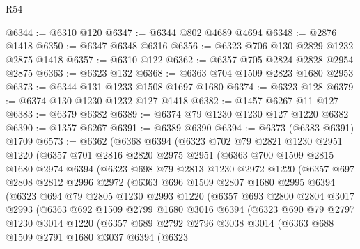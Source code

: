 \begin{lexlean}{R54}
\begin{coremodule}
@6344 := @6310 @120
@6347 := @6344 @802 @4689 @4694
@6348 := @2876 @1418
@6350 := @6347 @6348 @6316
@6356 := @6323 @706 @130 @2829 @1232 @2875 @1418
@6357 := @6310 @122
@6362 := @6357 @705 @2824 @2828 @2954 @2875
@6363 := @6323 @132
@6368 := @6363 @704 @1509 @2823 @1680 @2953
@6373 := @6344 @131 @1233 @1508 @1697 @1680
@6374 := @6323 @128
@6379 := @6374 @130 @1230 @1232 @127 @1418
@6382 := @1457 @6267 @11 @127
@6383 := @6379 @6382
@6389 := @6374 @79 @1230 @1230 @127 @1220 @6382
@6390 := @1357 @6267
@6391 := @6389 @6390
@6394 := @6373 (@6383 @6391) @1709
@6573 := @6362
    (@6368
      @6394
      (@6323
        @702
        @79
        @2821
        @1230
        @2951
        @1220
        (@6357
          @701
          @2816
          @2820
          @2975
          @2951
          (@6363
            @700
            @1509
            @2815
            @1680
            @2974
            @6394
            (@6323
              @698
              @79
              @2813
              @1230
              @2972
              @1220
              (@6357
                @697
                @2808
                @2812
                @2996
                @2972
                (@6363
                  @696
                  @1509
                  @2807
                  @1680
                  @2995
                  @6394
                  (@6323
                    @694
                    @79
                    @2805
                    @1230
                    @2993
                    @1220
                    (@6357
                      @693
                      @2800
                      @2804
                      @3017
                      @2993
                      (@6363
                        @692
                        @1509
                        @2799
                        @1680
                        @3016
                        @6394
                        (@6323
                          @690
                          @79
                          @2797
                          @1230
                          @3014
                          @1220
                          (@6357
                            @689
                            @2792
                            @2796
                            @3038
                            @3014
                            (@6363
                              @688
                              @1509
                              @2791
                              @1680
                              @3037
                              @6394
                              (@6323

\end{coremodule}
\end{lexlean}
